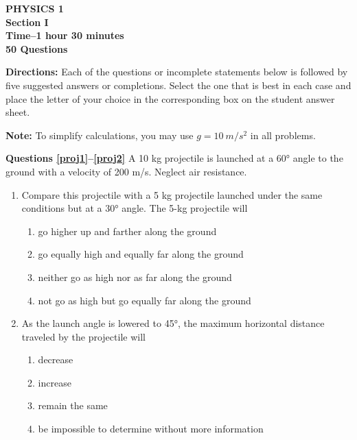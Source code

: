 \documentclass[11pt]{article}
\begin{document}
\begin{center}
  \textbf{PHYSICS 1\\
    Section I\\
    Time--1 hour 30 minutes\\
    50 Questions
  }
\end{center}

\textbf{Directions:} Each of the questions or incomplete statements below is
followed by five suggested answers or completions. Select the one that is best
in each case and place the letter of your choice in the corresponding box on
the student answer sheet.

\vspace{10pt}
\textbf{Note:} To simplify calculations, you may use $g=\SI{10}{m/s^2}$ in all
problems.

\raggedcolumns
\begin{multicols}{2}
  \textbf{Questions \ref{proj1}--\ref{proj2}} A 10 kg projectile is launched at
  a \ang{60} angle to the ground with a velocity of 200 m/s. Neglect air
  resistance.
  \begin{enumerate}[leftmargin=18pt]
  \item Compare this projectile with a 5 kg projectile launched under the same
    conditions but at a \ang{30} angle. The 5-kg projectile will
    \label{proj1}
    \begin{enumerate}[noitemsep,topsep=0pt,leftmargin=18pt,label=(\Alph*)]
    \item go higher up and farther along the ground
    \item go equally high and equally far along the ground
    \item neither go as high nor as far along the ground
    \item not go as high but go equally far along the ground
    \end{enumerate}
    
  \item As the launch angle is lowered to \ang{45}, the maximum horizontal
    distance traveled by the projectile will
    \label{proj2}
    \begin{enumerate}[noitemsep,topsep=0pt,leftmargin=18pt,label=(\Alph*)]
    \item decrease
    \item increase
    \item remain the same
    \item be impossible to determine without more information
    \end{enumerate}


\end{enumerate}
\end{multicols}
\end{document}
